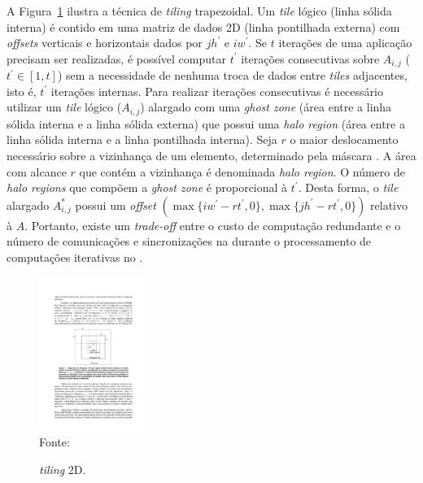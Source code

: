 A Figura~\ref{fig:block2d} ilustra a técnica de \textit{tiling} trapezoidal. Um
\textit{tile} lógico (linha sólida interna) é contido em uma matriz de dados 2D
(linha pontilhada externa) com \textit{offsets} verticais e horizontais dados
por $jh^\prime$ e $iw^\prime$. Se $t$ iterações de uma aplicação \stencil
precisam ser realizadas, é possível computar $t^\prime$ iterações consecutivas
sobre $A_{i,j}$ ($t^\prime \in \left[1,t\right]$) sem a necessidade de nenhuma
troca de dados entre \textit{tiles} adjacentes, isto é, $t^\prime$ iterações
internas. Para realizar iterações consecutivas é necessário utilizar um
\textit{tile} lógico ($A_{i,j}$) alargado com uma \textit{ghost zone} (área
entre a linha sólida interna e a linha sólida externa) que possui uma
\textit{halo region} (área entre a linha sólida interna e a linha pontilhada
interna). Seja $r$ o maior deslocamento necessário sobre a vizinhança de um
elemento, determinado pela máscara \stencil. A área com alcance $r$ que contém a
vizinhança é denominada \textit{halo region}. O número de \textit{halo regions}
que compõem a \textit{ghost zone} é proporcional à $t^\prime$. Desta forma, o
\textit{tile} alargado $A^\ast_{i,j}$ possui um \textit{offset} $(\max\{iw^\prime -
rt^\prime, 0\}, \max\{jh^\prime - rt^\prime, 0\})$ relativo à $A$. Portanto,
existe um \textit{trade-off} entre o custo de computação redundante e o número
de comunicações e sincronizações na \noc durante o processamento de computações
\stencil iterativas no \mppa.

\begin{figure}[!h]
  \begin{minipage}[b]{0.9\textwidth}
	\centering
    \caption{\textit{tiling} 2D.}
    \includegraphics[height=5cm]{figs/tile.pdf} \\
    Fonte:~\cite{rocha17}
	\label{fig:block2d}
  \end{minipage}
\end{figure}




